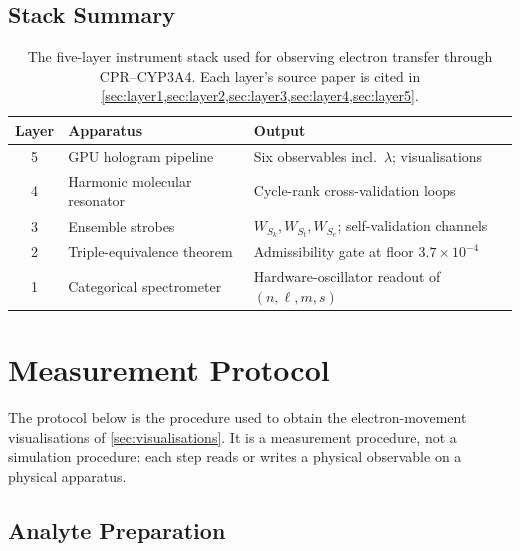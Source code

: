 \documentclass[11pt,twocolumn,a4paper]{article}
\theoremstyle{definition}
\theoremstyle{remark}
\begin{document}
\subsection{Stack Summary}
\label{sec:stack_summary}

\begin{table}[!h]
\centering\small
\begin{tabular}{cll}
\toprule
\textbf{Layer} & \textbf{Apparatus} & \textbf{Output} \\
\midrule
5 & GPU hologram pipeline      & Six observables incl.\ $\lambda$;
                                 visualisations \\
4 & Harmonic molecular resonator & Cycle-rank cross-validation
                                   loops \\
3 & Ensemble strobes           & $W_{S_k}, W_{S_t}, W_{S_e}$;
                                 self-validation channels \\
2 & Triple-equivalence theorem  & Admissibility gate at floor
                                  $3.7 \times 10^{-4}$ \\
1 & Categorical spectrometer    & Hardware-oscillator readout of
                                  $(n, \ell, m, s)$ \\
\bottomrule
\end{tabular}
\caption{The five-layer instrument stack used for observing electron
transfer through CPR--CYP3A4. Each layer's source paper is cited in
\cref{sec:layer1,sec:layer2,sec:layer3,sec:layer4,sec:layer5}.}
\label{tab:stack}
\end{table}

\section{Measurement Protocol}
\label{sec:protocol}

The protocol below is the procedure used to obtain the
electron-movement visualisations of \cref{sec:visualisations}. It is a
measurement procedure, not a simulation procedure: each step reads or
writes a physical observable on a physical apparatus.

\subsection{Analyte Preparation}
\label{sec:analyte_prep}
\end{document}
